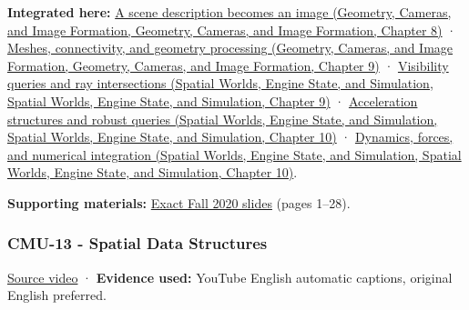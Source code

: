 \textbf{Integrated here:} \href{../03-Geometry-Cameras-and-Image-Formation/main.pdf\#nameddest=03-visual-computing-i-ch001-a-scene-description-becomes-an-image}{A scene description becomes an image (Geometry, Cameras, and Image Formation, Geometry, Cameras, and Image Formation, Chapter 8)} · \href{../03-Geometry-Cameras-and-Image-Formation/main.pdf\#nameddest=03-visual-computing-i-ch002-meshes-connectivity-and-geometry-processing}{Meshes, connectivity, and geometry processing (Geometry, Cameras, and Image Formation, Geometry, Cameras, and Image Formation, Chapter 9)} · \href{../05-Spatial-Worlds-Engine-State-and-Simulation/main.pdf\#nameddest=04-visual-computing-ii-ch028-visibility-queries-and-ray-intersections-1}{Visibility queries and ray intersections (Spatial Worlds, Engine State, and Simulation, Spatial Worlds, Engine State, and Simulation, Chapter 9)} · \href{../05-Spatial-Worlds-Engine-State-and-Simulation/main.pdf\#nameddest=04-visual-computing-ii-ch029-acceleration-structures-and-robust-queries-1}{Acceleration structures and robust queries (Spatial Worlds, Engine State, and Simulation, Spatial Worlds, Engine State, and Simulation, Chapter 10)} · \href{../05-Spatial-Worlds-Engine-State-and-Simulation/main.pdf\#nameddest=04-visual-computing-ii-ch029-dynamics-forces-and-numerical-integration}{Dynamics, forces, and numerical integration (Spatial Worlds, Engine State, and Simulation, Spatial Worlds, Engine State, and Simulation, Chapter 10)}.

\textbf{Supporting materials:} \href{https://15462.courses.cs.cmu.edu/fall2020content/lectures/12_geometricqueries/12_geometricqueries_slides.pdf}{Exact Fall 2020 slides} (pages 1--28).

\subsubsection{CMU-13 - Spatial Data Structures}\label{04-visual-computing-ii-ch036-cmu-13---spatial-data-structures}

\href{https://www.youtube.com/watch?v=NF7r-pC8fFc}{Source video} · \textbf{Evidence used:} YouTube English automatic captions, original English preferred.

